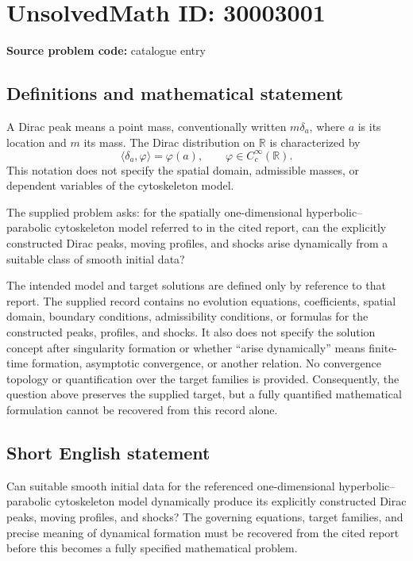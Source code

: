\documentclass[11pt]{article}
\newcommand{\R}{\mathbb{R}}
\begin{document}
\section*{UnsolvedMath ID: 30003001}
\textbf{Source problem code:} catalogue entry
\subsection{Definitions and mathematical statement}
A Dirac peak means a point mass, conventionally written \(m\delta_a\), where \(a\) is its location and \(m\) its mass. The Dirac distribution on \(\R\) is characterized by
\[
\langle\delta_a,\varphi\rangle=\varphi(a),\qquad \varphi\in C_c^\infty(\R).
\]
This notation does not specify the spatial domain, admissible masses, or dependent variables of the cytoskeleton model.

The supplied problem asks: for the spatially one-dimensional hyperbolic--parabolic cytoskeleton model referred to in the cited report, can the explicitly constructed Dirac peaks, moving profiles, and shocks arise dynamically from a suitable class of smooth initial data?

The intended model and target solutions are defined only by reference to that report. The supplied record contains no evolution equations, coefficients, spatial domain, boundary conditions, admissibility conditions, or formulas for the constructed peaks, profiles, and shocks. It also does not specify the solution concept after singularity formation or whether ``arise dynamically'' means finite-time formation, asymptotic convergence, or another relation. No convergence topology or quantification over the target families is provided. Consequently, the question above preserves the supplied target, but a fully quantified mathematical formulation cannot be recovered from this record alone.
\subsection{Short English statement}
Can suitable smooth initial data for the referenced one-dimensional hyperbolic--parabolic cytoskeleton model dynamically produce its explicitly constructed Dirac peaks, moving profiles, and shocks? The governing equations, target families, and precise meaning of dynamical formation must be recovered from the cited report before this becomes a fully specified mathematical problem.
\end{document}
